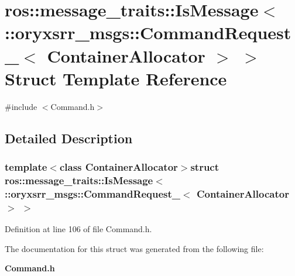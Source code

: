 \section{ros\-:\-:message\-\_\-traits\-:\-:\-Is\-Message$<$ \-:\-:oryxsrr\-\_\-msgs\-:\-:\-Command\-Request\-\_\-$<$ \-Container\-Allocator $>$ $>$ \-Struct \-Template \-Reference}
\label{structros_1_1message__traits_1_1IsMessage_3_01_1_1oryxsrr__msgs_1_1CommandRequest___3_01ContainerAllocator_01_4_01_4}


{\ttfamily \#include $<$\-Command.\-h$>$}



\subsection{\-Detailed \-Description}
\subsubsection*{template$<$class Container\-Allocator$>$struct ros\-::message\-\_\-traits\-::\-Is\-Message$<$ \-::oryxsrr\-\_\-msgs\-::\-Command\-Request\-\_\-$<$ Container\-Allocator $>$ $>$}



\-Definition at line 106 of file \-Command.\-h.



\-The documentation for this struct was generated from the following file\-:\begin{DoxyCompactItemize}
\item 
{\bf \-Command.\-h}\end{DoxyCompactItemize}
